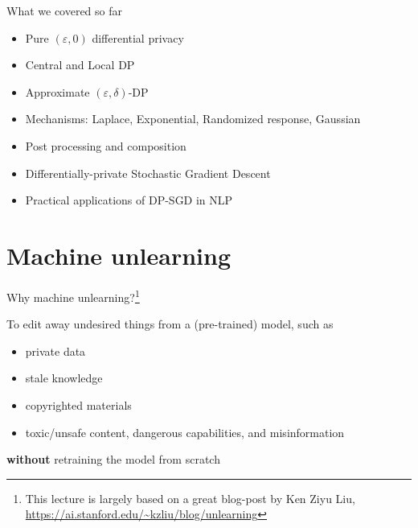 \documentclass[12pt,aspectratio=169,handout]{beamer}
\begin{document}
\begin{frame}{What we covered so far}

\begin{itemize}
\item Pure $(\varepsilon, 0)$ differential privacy
\item Central and Local DP
\item Approximate $(\varepsilon, \delta)$-DP
\item Mechanisms: Laplace, Exponential, Randomized response, Gaussian
\item Post processing and composition
\item Differentially-private Stochastic Gradient Descent
\item Practical applications of DP-SGD in NLP
\end{itemize}

\end{frame}

\section{Machine unlearning}

\begin{frame}{Why machine unlearning?\footnote{
This lecture is largely based on a great blog-post by Ken Ziyu Liu, \url{https://ai.stanford.edu/~kzliu/blog/unlearning}
}}


To edit away undesired things from a (pre-trained) model, such as
\begin{itemize}
\item private data
\item stale knowledge
\item copyrighted materials
\item toxic/unsafe content, dangerous capabilities, and misinformation
\end{itemize}

\textbf{without} retraining the model from scratch



\end{frame}
\end{document}
